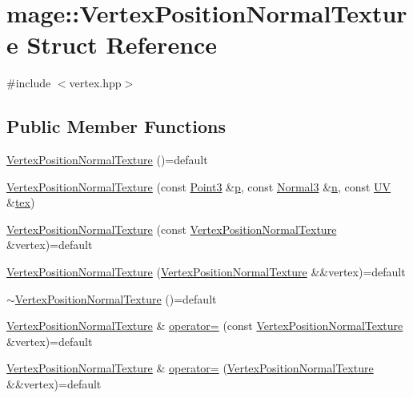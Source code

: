 \hypertarget{structmage_1_1_vertex_position_normal_texture}{}\section{mage\+:\+:Vertex\+Position\+Normal\+Texture Struct Reference}
\label{structmage_1_1_vertex_position_normal_texture}


{\ttfamily \#include $<$vertex.\+hpp$>$}

\subsection*{Public Member Functions}
\begin{DoxyCompactItemize}
\item 
\hyperlink{structmage_1_1_vertex_position_normal_texture_a05158b4e9daf54137a2b8fba80890034}{Vertex\+Position\+Normal\+Texture} ()=default
\item 
\hyperlink{structmage_1_1_vertex_position_normal_texture_af05d124e38e88cf4ecbcf4eccf6bc100}{Vertex\+Position\+Normal\+Texture} (const \hyperlink{structmage_1_1_point3}{Point3} \&\hyperlink{structmage_1_1_vertex_position_normal_texture_a9000b80274027dd7b7d258f45523ca65}{p}, const \hyperlink{structmage_1_1_normal3}{Normal3} \&\hyperlink{structmage_1_1_vertex_position_normal_texture_a442eb1609ab596e3e33c26f7be32695a}{n}, const \hyperlink{structmage_1_1_u_v}{UV} \&\hyperlink{structmage_1_1_vertex_position_normal_texture_a0782e41c5e28d421bfb47afad9af9c55}{tex})
\item 
\hyperlink{structmage_1_1_vertex_position_normal_texture_ac3c1a1038a7a493de5a314c383a84ce4}{Vertex\+Position\+Normal\+Texture} (const \hyperlink{structmage_1_1_vertex_position_normal_texture}{Vertex\+Position\+Normal\+Texture} \&vertex)=default
\item 
\hyperlink{structmage_1_1_vertex_position_normal_texture_addafeaefa77a932dd88e14bd14e0c7d0}{Vertex\+Position\+Normal\+Texture} (\hyperlink{structmage_1_1_vertex_position_normal_texture}{Vertex\+Position\+Normal\+Texture} \&\&vertex)=default
\item 
\hyperlink{structmage_1_1_vertex_position_normal_texture_a1dbfd9a6f88f075b59e56c353986b189}{$\sim$\+Vertex\+Position\+Normal\+Texture} ()=default
\item 
\hyperlink{structmage_1_1_vertex_position_normal_texture}{Vertex\+Position\+Normal\+Texture} \& \hyperlink{structmage_1_1_vertex_position_normal_texture_a89b92b0932f3271cb90c3a800e6c60a3}{operator=} (const \hyperlink{structmage_1_1_vertex_position_normal_texture}{Vertex\+Position\+Normal\+Texture} \&vertex)=default
\item 
\hyperlink{structmage_1_1_vertex_position_normal_texture}{Vertex\+Position\+Normal\+Texture} \& \hyperlink{structmage_1_1_vertex_position_normal_texture_a5a3417f7b3ead1e96147d68e7bb1185f}{operator=} (\hyperlink{structmage_1_1_vertex_position_normal_texture}{Vertex\+Position\+Normal\+Texture} \&\&vertex)=default
\end{DoxyCompactItemize}
